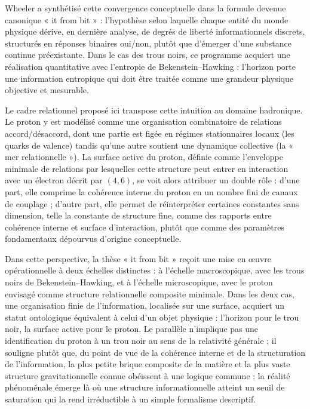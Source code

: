 \documentclass[11pt,a4paper]{article}
\begin{document}
Wheeler a synthétisé cette convergence conceptuelle dans la formule devenue canonique « it from bit » : l’hypothèse selon laquelle chaque entité du monde physique dérive, en dernière analyse, de degrés de liberté informationnels discrets, structurés en réponses binaires oui/non, plutôt que d’émerger d’une substance continue préexistante. Dans le cas des trous noirs, ce programme acquiert une réalisation quantitative avec l’entropie de Bekenstein–Hawking : l’horizon porte une information entropique qui doit être traitée comme une grandeur physique objective et mesurable.

Le cadre relationnel proposé ici transpose cette intuition au domaine hadronique. Le proton y est modélisé comme une organisation combinatoire de relations accord/désaccord, dont une partie est figée en régimes stationnaires locaux (les quarks de valence) tandis qu’une autre soutient une dynamique collective (la « mer relationnelle »). La surface active du proton, définie comme l’enveloppe minimale de relations par lesquelles cette structure peut entrer en interaction avec un électron décrit par \(\left(4,6\right)\), se voit alors attribuer un double rôle : d’une part, elle comprime la cohérence interne du proton en un nombre fini de canaux de couplage ; d’autre part, elle permet de réinterpréter certaines constantes sans dimension, telle la constante de structure fine, comme des rapports entre cohérence interne et surface d’interaction, plutôt que comme des paramètres fondamentaux dépourvus d’origine conceptuelle.

Dans cette perspective, la thèse « it from bit » reçoit une mise en œuvre opérationnelle à deux échelles distinctes : à l’échelle macroscopique, avec les trous noirs de Bekenstein–Hawking, et à l’échelle microscopique, avec le proton envisagé comme structure relationnelle composite minimale. Dans les deux cas, une organisation finie de l’information, localisée sur une surface, acquiert un statut ontologique équivalent à celui d’un objet physique : l’horizon pour le trou noir, la surface active pour le proton. Le parallèle n’implique pas une identification du proton à un trou noir au sens de la relativité générale ; il souligne plutôt que, du point de vue de la cohérence interne et de la structuration de l’information, la plus petite brique composite de la matière et la plus vaste structure gravitationnelle connue obéissent à une logique commune : la réalité phénoménale émerge là où une structure informationnelle atteint un seuil de saturation qui la rend irréductible à un simple formalisme descriptif.
\end{document}
